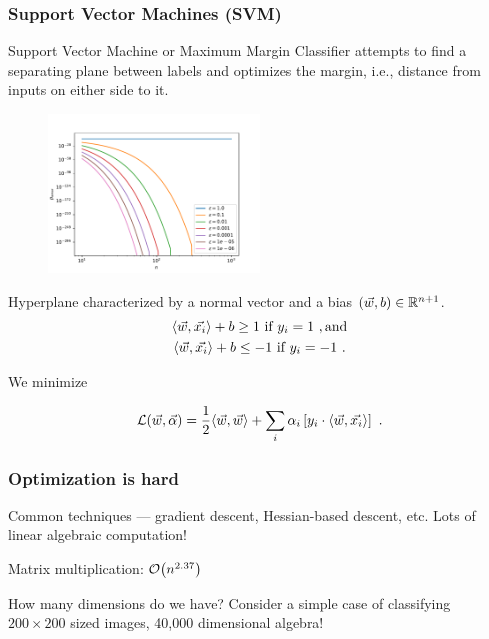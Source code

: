 \begin{frame}
    \frametitle{Support Vector Machines (SVM)}

    Support Vector Machine or Maximum Margin Classifier attempts to find a
    separating plane between labels and optimizes the margin, i.e., distance
    from inputs on either side to it.

    \begin{multicols}{2}
        \begin{figure}
            \includegraphics[width=0.5\textwidth]{figures/perrorplot.pdf}
        \end{figure}
        Hyperplane characterized by a normal vector and a bias \((\vec{w}, b) \in
        \mathbb{R}^{n+1}\).
        \begin{gather*}
            \langle \vec{w}, \vec{x_i}\rangle + b \geq 1 \text{ if } y_i = 1~, \text{and}\\
            \langle \vec{w}, \vec{x_i}\rangle + b \leq -1 \text{ if } y_i = -1~.
        \end{gather*}

        We minimize

        \begin{equation*}
            \mathcal{L}(\vec{w}, \vec{\alpha}) = \frac{1}{2} \langle \vec{w}, \vec{w}\rangle + \sum_i \alpha_i \left[y_i \cdot \langle \vec{w}, \vec{x_i}\rangle\right]~.
        \end{equation*}
    \end{multicols}

\end{frame}

\begin{frame}
    \frametitle{Optimization is hard}

    Common techniques --- gradient descent, Hessian-based descent, etc.
    Lots of linear algebraic computation! 

    Matrix multiplication: \(\order{n^{2.37}}\)

    How many dimensions do we have? Consider a simple case of classifying
    \(200\times 200\) sized images, 40,000 dimensional algebra!

\end{frame}

